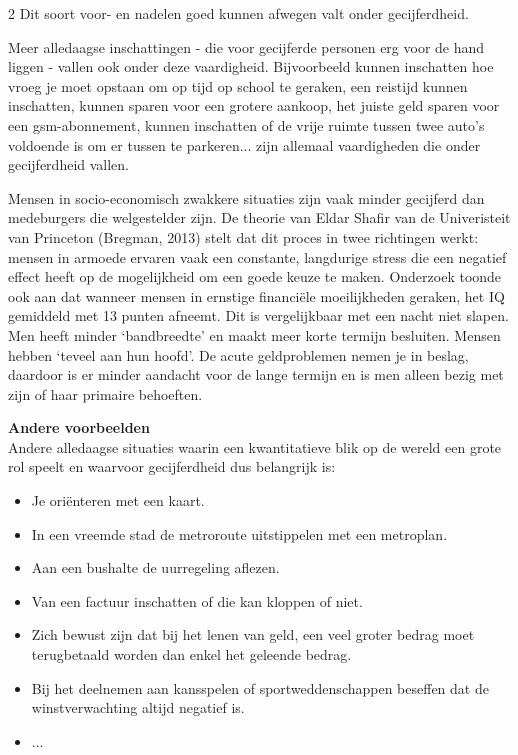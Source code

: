 \begin{multicols}{2}
Dit soort voor- en nadelen goed kunnen afwegen valt onder gecijferdheid.


Meer alledaagse inschattingen - die voor gecijferde personen erg voor de hand liggen - vallen ook onder deze vaardigheid. Bijvoorbeeld kunnen inschatten hoe vroeg je moet opstaan om op tijd op school te geraken, een reistijd kunnen inschatten, kunnen sparen voor een grotere aankoop, het juiste geld sparen voor een gsm-abonnement, kunnen inschatten of de vrije ruimte tussen twee auto's voldoende is om er tussen te parkeren... zijn allemaal vaardigheden die onder gecijferdheid vallen.

Mensen in socio-economisch zwakkere situaties zijn vaak minder gecijferd dan medeburgers die welgestelder zijn. De theorie van Eldar Shafir van de Univeristeit van Princeton (Bregman, 2013) stelt dat dit proces in twee richtingen werkt: mensen in armoede ervaren vaak een constante, langdurige stress die een negatief effect heeft op de mogelijkheid om een goede keuze te maken. Onderzoek toonde ook aan dat wanneer mensen in ernstige financiële moeilijkheden geraken, het IQ gemiddeld met 13 punten afneemt. Dit is vergelijkbaar met een nacht niet slapen. Men heeft minder `bandbreedte' en maakt meer korte termijn besluiten. Mensen hebben `teveel aan hun hoofd’. De acute geldproblemen nemen je in beslag, daardoor is er minder aandacht voor de lange termijn en is men alleen bezig met zijn of haar primaire behoeften.


\textbf{Andere voorbeelden}\\
Andere alledaagse situaties waarin een kwantitatieve blik op de wereld een grote rol speelt en waarvoor gecijferdheid dus belangrijk is:
\begin{itemize}
    \item Je oriënteren met een kaart.
    \item In een vreemde stad de metroroute uitstippelen met een metroplan.
    \item Aan een bushalte de uurregeling aflezen.
    \item Van een factuur inschatten of die kan kloppen of niet.
    \item Zich bewust zijn dat bij het lenen van geld, een veel groter bedrag moet terugbetaald worden dan enkel het geleende bedrag.
    \item Bij het deelnemen aan kansspelen of sportweddenschappen beseffen dat de winstverwachting altijd negatief is.
    \item ...
\end{itemize}


\end{multicols}
